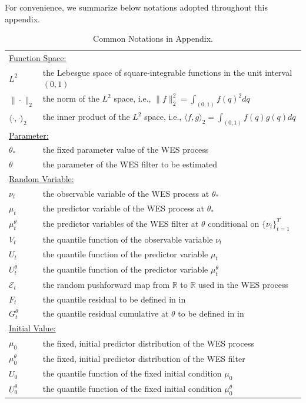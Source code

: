 \documentclass[a4paper, 11pt]{article}
\newcommand{\R}{\mathbb{R}}
\newcommand{\T}{\mathcal E}
\theoremstyle{definition}
\begin{document}
For convenience, we summarize below notations adopted throughout this appendix.

\begin{table}[h]
	\caption{Common Notations in Appendix.} \label{table:1}
	\centering
	\begin{tabular}{ll} 
		\toprule
		\multicolumn{2}{l}{\underline{Function Space:}} \\
		$L^2$ & the Lebesgue space of square-integrable functions in the unit interval $(0, 1)$ \\
		$\| \cdot \|_2$ & the norm of the $L^2$ space, i.e., $\| f \|_2^2 = \int_{(0,1)} f(q)^2 dq$ \\
		$\langle \cdot, \cdot \rangle_2$ & the inner product of the $L^2$ space, i.e., $\langle f, g \rangle_2 = \int_{(0,1)} f(q) g(q) dq$ \\
		\multicolumn{2}{l}{\underline{Parameter:}} \\
		$\theta_*$ & the fixed parameter value of the WES process \\
		$\theta$ & the parameter of the WES filter to be estimated \\
		\multicolumn{2}{l}{\underline{Random Variable:}} \\
		$\nu_t$ & the observable variable of the WES process at $\theta_*$ \\
		$\mu_t$ & the predictor variable of the WES process at $\theta_*$ \\
		$\mu_t^\theta$ & the predictor variables of the WES filter at $\theta$ conditional on $\{ \nu_t \}_{t=1}^{T}$ \\
		$V_t$ & the quantile function of the observable variable $\nu_t$ \\
		$U_t$ & the quantile function of the predictor variable $\mu_t$ \\
		$U_t^\theta$ & the quantile function of the predictor variable $\mu_t^\theta$ \\
		$\T_t$ & the random pushforward map from $\R$ to $\R$ used in the WES process \\
		$F_t$ & the quantile residual to be defined in \Cref{def:quantile_residual} in \Cref{sec:WES_error_correction_form} \\
		$G_t^\theta$ & the quantile residual cumulative at $\theta$ to be defined in \Cref{def:residual_cumulative} in \Cref{apx:preparation} \\
		\multicolumn{2}{l}{\underline{Initial Value:}} \\
		$\mu_0$ & the fixed, initial predictor distribution of the WES process \\
		$\mu_0^\theta$ & the fixed, initial predictor distribution of the WES filter \\
        $U_0$ & the quantile function of the fixed initial condition $\mu_0$ \\
		$U_0^\theta$ & the quantile function of the fixed initial condition $\mu_0^\theta$ \\
		\bottomrule
	\end{tabular}
\end{table}
\end{document}
